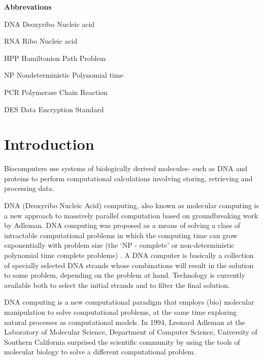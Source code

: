 \newpage
\tableofcontents
\listoffigures
\newpage

\textbf{Abbrevations}
\begin{abbreviations}
\item[DNA] Deoxyribo Nucleic acid
\item[RNA] Ribo Nucleic acid
\item[HPP] Hamiltonion Path Problem
\item[NP] Nondeterministic Polynomial time
\item[PCR] Polymerase  Chain  Reaction
\item[DES] Data Encryption Standard 

\end{abbreviations}
\newpage
\renewcommand{\abstractname}{\Large Abstract}
	
\newpage
{}
\section{Introduction}
\label{sec:introduction}

Biocomputers use systems of biologically derived molecules- such as DNA and proteins to perform computational calculations involving storing, retrieving and processing data.

DNA  (Deoxyribo Nucleic  Acid)  computing,  also  known  as  molecular 
computing is a new approach to massively parallel computation based on 
groundbreaking  work  by  Adleman.  DNA  computing  was  proposed  as  a 
means of solving a class of intractable computational problems in which
the  computing  time  can  grow  exponentially  with  problem  size  (the  `NP
- complete' or non-deterministic polynomial time complete problems) .
A  DNA  computer  is  basically  a  collection  of  specially  selected  DNA 
strands whose combinations will result in the solution to some problem, depending  on  the  problem  at  hand.  Technology  is  currently  available both  to  select  the  initial  strands  and  to  filter  the  final  solution.

DNA computing is a new computational paradigm that employs (bio) molecular 
manipulation   to   solve   computational   problems,   at   the   same   time exploring  natural  processes  as  computational  models.  In  1994, 
Leonard Adleman at the Laboratory of Molecular   Science, Department of Computer Science, University   of   Southern   California   surprised   the 
scientific  community  by  using  the  tools  of  molecular  biology  to  solve  a different computational problem. 

